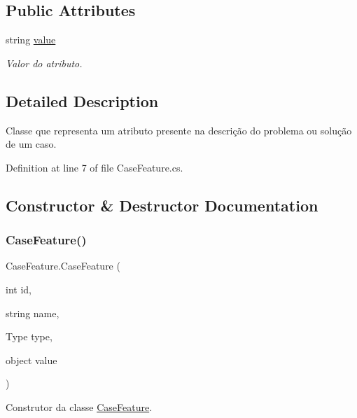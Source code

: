 \subsection*{Public Attributes}
\begin{DoxyCompactItemize}
\item 
string \hyperlink{class_case_feature_a1aa9c93657c27e6a8debdf71a40f5b89}{value}
\begin{DoxyCompactList}\small\item\em Valor do atributo. \end{DoxyCompactList}\end{DoxyCompactItemize}


\subsection{Detailed Description}
Classe que representa um atributo presente na descrição do problema ou solução de um caso. 



Definition at line 7 of file Case\+Feature.\+cs.



\subsection{Constructor \& Destructor Documentation}
\hypertarget{class_case_feature_a9443dc93f40c63cc812c4102f15498c5}{}\label{class_case_feature_a9443dc93f40c63cc812c4102f15498c5} 
\subsubsection{\texorpdfstring{Case\+Feature()}{CaseFeature()}\hspace{0.1cm}{\footnotesize\ttfamily [1/2]}}
{\footnotesize\ttfamily Case\+Feature.\+Case\+Feature (\begin{DoxyParamCaption}\item[{int}]{id,  }\item[{string}]{name,  }\item[{Type}]{type,  }\item[{object}]{value }\end{DoxyParamCaption})}



Construtor da classe \hyperlink{class_case_feature}{Case\+Feature}. 


